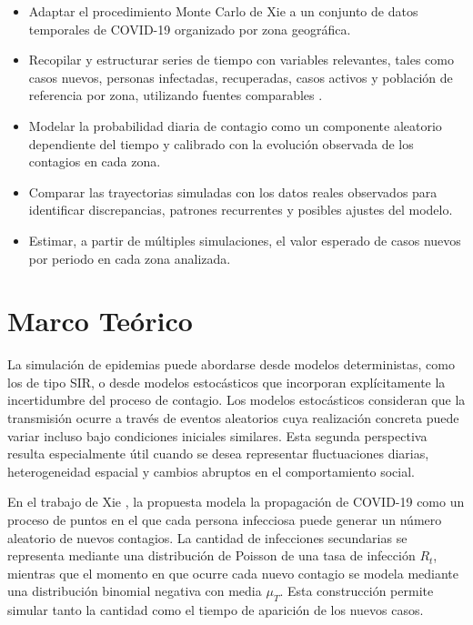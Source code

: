 \documentclass[12pt]{article}
\begin{document}
\begin{itemize}
  \item Adaptar el procedimiento Monte Carlo de Xie \cite{Xie2020} a un
        conjunto de datos temporales de COVID-19 organizado por zona geográfica.
  \item Recopilar y estructurar series de tiempo con variables relevantes,
        tales como casos nuevos, personas infectadas, recuperadas, casos
        activos y población de referencia por zona, utilizando fuentes
        comparables \cite{owid-coronavirus}.
  \item Modelar la probabilidad diaria de contagio como un componente aleatorio
        dependiente del tiempo y calibrado con la evolución observada de los
        contagios en cada zona.
  \item Comparar las trayectorias simuladas con los datos reales observados
        para identificar discrepancias, patrones recurrentes y posibles ajustes
        del modelo.
  \item Estimar, a partir de múltiples simulaciones, el valor esperado de
        casos nuevos por periodo en cada zona analizada.
\end{itemize}

\newpage

\section{Marco Teórico}

La simulación de epidemias puede abordarse desde modelos deterministas, como
los de tipo SIR, o desde modelos estocásticos que incorporan explícitamente la
incertidumbre del proceso de contagio.
Los modelos estocásticos consideran que la transmisión
ocurre a través de eventos aleatorios cuya realización concreta puede variar
incluso bajo condiciones iniciales similares. Esta segunda perspectiva resulta
especialmente útil cuando se desea representar fluctuaciones diarias,
heterogeneidad espacial y cambios abruptos en el comportamiento social.

En el trabajo de Xie \cite{Xie2020},
la propuesta modela la propagación de COVID-19 como un proceso de puntos en el
que cada persona infecciosa puede generar un número aleatorio de nuevos
contagios. La cantidad de infecciones secundarias se representa mediante una
distribución de Poisson de una tasa de infección \(R_t\),
mientras que el momento en que ocurre cada nuevo contagio se modela mediante
una distribución binomial negativa con media \(\mu_T\). Esta construcción
permite simular tanto la cantidad como el tiempo de aparición de los nuevos
casos.
\end{document}
